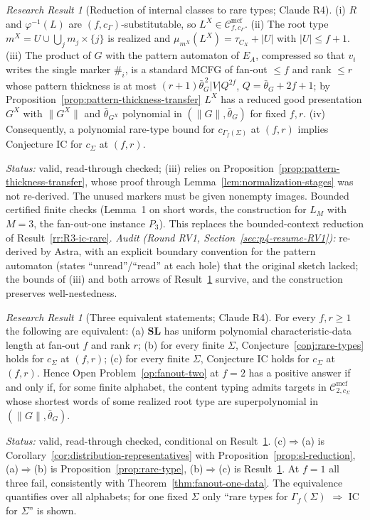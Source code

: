 \documentclass[11pt]{article}
\numberwithin{equation}{section}
\theoremstyle{plain}
\theoremstyle{definition}
\theoremstyle{remark}
\newtheorem{rresult}[theorem]{Research Result}
\newcommand{\Cmcf}[2]{\mathcal{C}^{\mathrm{mcf}}_{#1,#2}}
\theoremstyle{plain}
\begin{document}
\begin{rresult}[Reduction of internal classes to rare types; Claude R4]
\label{rr:R4-reduction}
(i) $R$ and $\varphi^{-1}(L)$ are $(f,c_\Gamma)$-substitutable, so
$L^X\in\Cmcf{f}{c_\Gamma}$.  (ii) The root type
$m^X=U\cup\bigcup_j m_j\times\{j\}$ is realized and
$\mu_{m^X}(L^X)=\tau_{C_X}+|U|$ with $|U|\le f+1$.  (iii) The product of $G$ with the
pattern automaton of $E_A$, compressed so that $v_i$ writes the single marker $\#_i$,
is a standard MCFG of fan-out $\le f$ and rank $\le r$ whose pattern thickness is at
most $(r+1)\bar\theta_G^{\,2}|V|Q^{2f}$, $Q=\bar\theta_G+2f+1$; by
Proposition~\ref{prop:pattern-thickness-transfer} $L^X$ has a reduced good presentation
$G^X$ with $\|G^X\|$ and $\bar\theta_{G^X}$ polynomial in $(\|G\|,\bar\theta_G)$ for
fixed $f,r$.  (iv) Consequently, a polynomial rare-type bound for $c_{\Gamma_f(\Sigma)}$
at $(f,r)$ implies Conjecture IC for $c_\Sigma$ at $(f,r)$.
\end{rresult}
\noindent\emph{Status:} valid, read-through checked; (iii) relies on
Proposition~\ref{prop:pattern-thickness-transfer}, whose proof through
Lemma~\ref{lem:normalization-stages} was not re-derived.  The unused markers must be
given nonempty images.  Bounded certified finite checks (Lemma~1 on short words, the
construction for $L_M$ with $M=3$, the fan-out-one instance $P_3$).  This replaces the
bounded-context reduction of Result~\ref{rr:R3-ic-rare}.
\emph{Audit (Round RV1, Section~\ref{sec:p4-resume-RV1}):} re-derived by Astra, with an explicit
boundary convention for the pattern automaton (states ``unread''/``read'' at each hole) that the
original sketch lacked; the bounds of (iii) and both arrows of Result~\ref{rr:R4-equivalence}
survive, and the construction preserves well-nestedness.

\begin{rresult}[Three equivalent statements; Claude R4]
\label{rr:R4-equivalence}
For every $f,r\ge1$ the following are equivalent:
(a) $\mathbf{SL}$ has uniform polynomial characteristic-data length at fan-out $f$ and
rank $r$;
(b) for every finite $\Sigma$, Conjecture~\ref{conj:rare-types} holds for $c_\Sigma$ at
$(f,r)$;
(c) for every finite $\Sigma$, Conjecture IC holds for $c_\Sigma$ at $(f,r)$.
Hence Open Problem~\ref{op:fanout-two} at $f=2$ has a positive answer if and only if,
for some finite alphabet, the content typing admits targets in $\Cmcf{2}{c_\Sigma}$ whose
shortest words of some realized root type are superpolynomial in
$(\|G\|,\bar\theta_G)$.
\end{rresult}
\noindent\emph{Status:} valid, read-through checked, conditional on
Result~\ref{rr:R4-reduction}.  (c)$\Rightarrow$(a) is
Corollary~\ref{cor:distribution-representatives} with
Proposition~\ref{prop:sl-reduction}, (a)$\Rightarrow$(b) is
Proposition~\ref{prop:rare-type}, (b)$\Rightarrow$(c) is Result~\ref{rr:R4-reduction}.
At $f=1$ all three fail, consistently with Theorem~\ref{thm:fanout-one-data}.  The
equivalence quantifies over all alphabets; for one fixed $\Sigma$ only
``rare types for $\Gamma_f(\Sigma)$ $\Rightarrow$ IC for $\Sigma$'' is shown.
\end{document}
